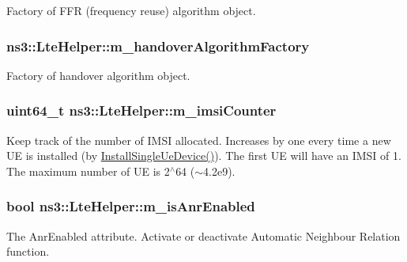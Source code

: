 Factory of F\+FR (frequency reuse) algorithm object. 

\subsubsection[{\texorpdfstring{m\+\_\+handover\+Algorithm\+Factory}{m_handoverAlgorithmFactory}}]{ ns3\+::\+Lte\+Helper\+::m\+\_\+handover\+Algorithm\+Factory\hspace{0.3cm}{\ttfamily [private]}}\hypertarget{classns3_1_1LteHelper_a32db920fb44f4b65250e3cc23eeadd77}{}\label{classns3_1_1LteHelper_a32db920fb44f4b65250e3cc23eeadd77}


Factory of handover algorithm object. 

\subsubsection[{\texorpdfstring{m\+\_\+imsi\+Counter}{m_imsiCounter}}]{\setlength{\rightskip}{0pt plus 5cm}uint64\+\_\+t ns3\+::\+Lte\+Helper\+::m\+\_\+imsi\+Counter\hspace{0.3cm}{\ttfamily [private]}}\hypertarget{classns3_1_1LteHelper_acd9bb1a78fa9f3648ec5eb17ad07029c}{}\label{classns3_1_1LteHelper_acd9bb1a78fa9f3648ec5eb17ad07029c}
Keep track of the number of I\+M\+SI allocated. Increases by one every time a new UE is installed (by \hyperlink{classns3_1_1LteHelper_afa6e13db5742241f48f8f4b8533b67f6}{Install\+Single\+Ue\+Device()}). The first UE will have an I\+M\+SI of 1. The maximum number of UE is 2$^\wedge$64 ($\sim$4.2e9). 
\subsubsection[{\texorpdfstring{m\+\_\+is\+Anr\+Enabled}{m_isAnrEnabled}}]{\setlength{\rightskip}{0pt plus 5cm}bool ns3\+::\+Lte\+Helper\+::m\+\_\+is\+Anr\+Enabled\hspace{0.3cm}{\ttfamily [private]}}\hypertarget{classns3_1_1LteHelper_a7ea3223dfc520265e1c8423b55b9ab18}{}\label{classns3_1_1LteHelper_a7ea3223dfc520265e1c8423b55b9ab18}
The {\ttfamily Anr\+Enabled} attribute. Activate or deactivate Automatic Neighbour Relation function. 
